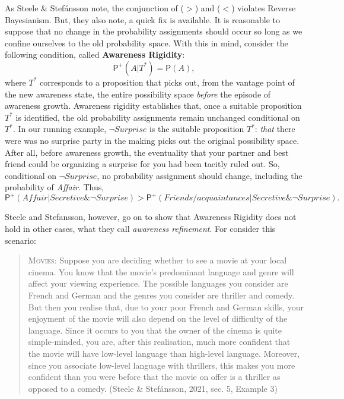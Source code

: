 \documentclass[
  11pt,
  dvipsnames,enabledeprecatedfontcommands]{scrartcl}
\newcommand{\pr}[1]{\ensuremath{\mathsf{P}(#1)}}
\newcommand{\ppr}[2]{\ensuremath{\mathsf{P}^{#1}(#2)}}
\begin{document}
As Steele \& Stefánsson note, the conjunction of (\(>\)) and (\(<\))
violates Reverse Bayesianism. But, they also note, a quick fix is
available. It is reasonable to suppose that no change in the probability
assignments should occur so long as we confine ourselves to the old
probability space. With this in mind, consider the following condition,
called \textbf{Awareness Rigidity}: \[\ppr{+}{A \vert T^*}=\pr{A},\]
where \(T^*\) corresponds to a proposition that picks out, from the
vantage point of the new awareness state, the entire possibility space
\emph{before} the episode of awareness growth. Awareness rigidity
establishes that, once a suitable proposition \(T^*\) is identified, the
old probability assignments remain unchanged conditional on \(T^*\). In
our running example, \(\neg\textit{Surprise}\) is the suitable
proposition \(T^*\): \emph{that} there were was no surprise party in the
making picks out the original possibility space. After all, before
awareness growth, the eventuality that your partner and best friend
could be organizing a surprise for you had been tacitly ruled out. So,
conditional on \(\neg\textit{Surprise}\), no probability assignment
should change, including the probability of \textit{Affair}. Thus,
\[\ppr{+}{\textit{Affair} \vert  \textit{Secretive} \& \neg\textit{Surprise} } > \ppr{+}{\textit{Friends/acquaintances} \vert \textit{Secretive} \& \neg\textit{Surprise}}. \]

Steele and Stefansson, however, go on to show that Awareness Rigidity
does not hold in other cases, what they call \emph{awareness
refinement}. For consider this scenario:

\begin{quote}
\textsc{Movies}: Suppose you are deciding whether to see a movie at your
local cinema. You know that the movie's predominant language and genre
will affect your viewing experience. The possible languages you consider
are French and German and the genres you consider are thriller and
comedy. But then you realise that, due to your poor French and German
skills, your enjoyment of the movie will also depend on the level of
difficulty of the language. Since it occurs to you that the owner of the
cinema is quite simple-minded, you are, after this realisation, much
more confident that the movie will have low-level language than
high-level language. Moreover, since you associate low-level language
with thrillers, this makes you more confident than you were before that
the movie on offer is a thriller as opposed to a comedy. (Steele \&
Stefánsson, 2021, sec. 5, Example 3)
\end{quote}
\end{document}
